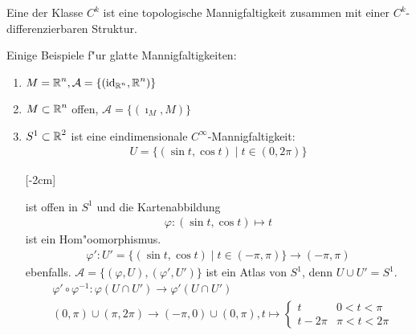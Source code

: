 \begin{Dfn}
  Eine  der Klasse $C^k$ ist eine topologische Mannigfaltigkeit zusammen mit einer $C^{k}$-differenzierbaren Struktur.\\
\end{Dfn}

\begin{bsp}
  Einige Beispiele f"ur glatte Mannigfaltigkeiten:
  \begin{enumerate}[leftmargin=*,label=\arabic*)]
  \item $M = \operatorname{\mathbb{R}}^n, \mathcal A = \{(\operatorname{id}_{\operatorname{\mathbb{R}}^n},\operatorname{\mathbb{R}}^n)\}$
  \item $M \subset \operatorname{\mathbb{R}}^n$ offen, $\mathcal A = \{(\imath_{M},M)\}$
  \item $S^1 \subset \operatorname{\mathbb{R}}^2$ ist eine eindimensionale $C^{\infty}$-Mannigfaltigkeit:
    \begin{align*}
      U = \{(\sin t, \cos t) \mid t \in (0,2\pi)\}
    \end{align*}

    [-2cm]

    ist offen in $S^1$ und die Kartenabbildung
    \begin{align*}
      \varphi \colon (\sin t, \cos t) \mapsto t
    \end{align*}
    ist ein Hom"oomorphismus.
    \begin{align*}
      \varphi' \colon U' = \{(\sin t, \cos t) \mid t \in (-\pi,\pi)\} \to (-\pi,\pi)
    \end{align*}
    ebenfalls. $\mathcal A = \{(\varphi, U), (\varphi',U')\}$ ist ein Atlas von $S^1$, denn $U \cup U' = S^1$.
    \begin{align*}
      & \varphi' \circ \varphi^{-1} \colon \varphi(U \cap U') \to \varphi'(U \cap U')\\
      & (0,\pi)\cup(\pi,2\pi) \to (-\pi,0)\cup(0,\pi), t \mapsto \begin{cases}
        t & 0 < t < \pi\\
        t-2\pi & \pi < t < 2\pi
      \end{cases}
    \end{align*}


\end{enumerate}
\end{bsp}
